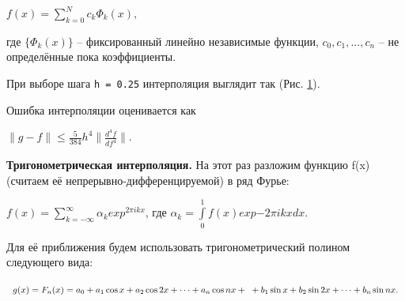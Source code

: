 \documentclass{article}
\begin{document}
				\begin{center}$f(x)=\sum_{k=0}^N {c_k\Phi_k(x)},$\end{center} где $\{\Phi_k(x)\}$ -- фиксированный линейно независимые функции, $c_0, c_1, ... , c_n$ -- не определённые пока коэффициенты.
				
				
				
				При выборе шага \texttt{h = 0.25} интерполяция выглядит так (Рис. \ref{fig:dix4}).
				
				\begin{figure}
					\label{fig:dix4}
				\end{figure}
				
				Ошибка интерполяции оценивается как \begin{center}$\parallel g-f\parallel \le \frac{5}{384}h^4\parallel \frac{d^4f}{df^4}\parallel$.\\\end{center}
				
				\textbf{Тригонометрическая интерполяция.}
				На этот раз разложим функцию f(x) (считаем её непрерывно-дифференцируемой) в ряд Фурье:
				
				\begin{center}$f(x)=\sum_{k=-\infty}^{\infty} \alpha_k exp^{2\pi i k x}$, где $\alpha_k=\int \limits_{0}^{1} f(x) exp {-2 \pi i k x} dx$.\end{center}
				
				Для её приближения будем использовать тригонометрический полином следующего вида: 
				
				$g(x) = F_n(x)=a_0 + a_1 \cos x + a_2 \cos 2x+\dots + a_n \cos nx + \\ \ + b_1 \sin x + b_2 \sin 2x+\dots + b_n \sin nx . $
				
\end{document}
